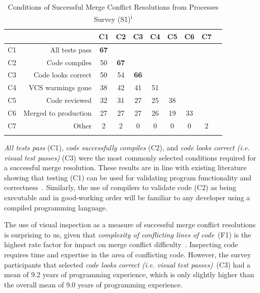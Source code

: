 \begin{table}[!htbp]
\caption{Conditions of Successful Merge Conflict Resolutions from Processes Survey (S1)\textsuperscript{i}}
\label{conditionsSuccess}
\centering
\begin{tabularx}{\textwidth}{@{}lr|*{7}{C}c@{}}
\toprule
	&
	& C1
	& C2
	& C3
	& C4
	& C5
	& C6
	& C7 \\
\midrule
	C1 & All tests pass & \textbf{67} & & & & & & \\
	C2 & Code compiles & 50 & \textbf{67} & & & & & \\
	C3 & Code looks correct & 50 & 54 & \textbf{66} & & & & \\
	C4 & VCS warmings gone & 38 & 42 & 41 & 51 & & & \\
	C5 & Code reviewed & 32 & 31 & 27 & 25 & 38 & & \\
	C6 & Merged to production & 27 & 27 & 27 & 26 & 19 & 33 & \\
	C7 & Other & 2 & 2 & 0 & 0 & 0 & 0 & 2 \\
\bottomrule
     \\
\end{tabularx}
\end{table}

\textit{All tests pass} (C1), \textit{code successfully compiles} (C2), and \textit{code looks correct (i.e. visual test passes)} (C3) were the most commonly selected conditions required for a successful merge resolution.
These results are in line with existing literature showing that testing (C1) can be used for validating program functionality and correctness~\cite{beizer1984software,tian2005software}. %
Similarly, the use of compilers to validate code (C2) as being executable and in good-working order will be familiar to any developer using a compiled programming language.

The use of visual inspection as a measure of successful merge conflict resolutions is surprising to us, given that \textit{complexity of conflicting lines of code}~(F1) is the highest rate factor for impact on merge conflict difficulty~\cite{mckee2017software}.
Inspecting code requires time and expertise in the area of conflicting code.
However, the survey participants that selected \textit{code looks correct (i.e. visual test passes)}~(C3) had a mean of 9.2 years of programming experience, which is only slightly higher than the overall mean of 9.0 years of programming experience.

